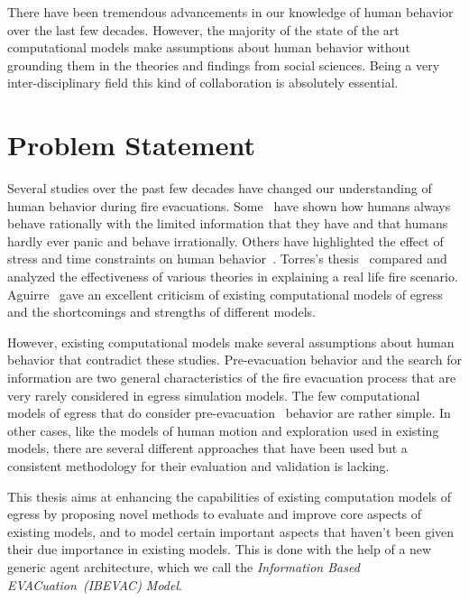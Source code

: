 There have been tremendous advancements in our knowledge of human behavior over the last few decades. However, the majority of the state of the art computational models make assumptions about human behavior without grounding them in the theories and findings from social sciences. Being a very inter-disciplinary field this kind of collaboration is absolutely essential. 

\section{Problem Statement}
\label{Intro:ProblemStatement}

Several studies over the past few decades have changed our understanding of human behavior during fire evacuations. Some~\cite{Kobes:2009jx,Schadschneider:2008cz,Reicher:2008ep,Torres:2010tj,Paulsen:1984ti,Sime:1983uy} have shown how humans always behave rationally with the limited information that they have and that humans hardly ever panic and behave irrationally. Others have highlighted the effect of stress and time constraints on human behavior~\cite{Ozel:2001tn}. Torres's thesis~\cite{Torres:2010tj} compared and analyzed the effectiveness of various theories in explaining a real life fire scenario. Aguirre~\cite{Aguirre:2004tn} gave an excellent criticism of existing computational models of egress and the shortcomings and strengths of different models.

However, existing computational models make several assumptions about human behavior that contradict these studies. Pre-evacuation behavior and the search for information are two general characteristics of the fire evacuation process that are very rarely considered in egress simulation models. The few computational models of egress that do consider pre-evacuation~\cite{Pires:2005gs,Klupfel:2003wa} behavior are rather simple. In other cases, like the models of human motion and exploration used in existing models, there are several different approaches that have been used but a consistent methodology for their evaluation and validation is lacking. 


This thesis aims at enhancing the capabilities of existing computation models of egress by proposing novel methods to evaluate and improve core aspects of existing models, and to model certain important aspects that haven't been given their due importance in existing models. This is done with the help of a new generic agent architecture, which we call the \emph{Information Based EVACuation~(IBEVAC) Model}.

